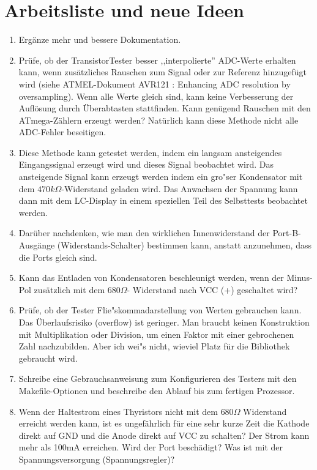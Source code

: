 
\chapter{Arbeitsliste und neue Ideen}
\label{sec:todo}

\begin{enumerate}
\item Erg\"anze mehr und bessere Dokumentation.
\item Pr\"ufe, ob der TransistorTester besser ,,interpolierte''  ADC-Werte erhalten kann, wenn zus\"atz\-liches Rauschen zum Signal
oder zur Referenz hinzugef\"ugt wird (siehe ATMEL-Dokument AVR121 \cite{AVR121}: Enhancing ADC resolution by oversampling).
Wenn alle Werte gleich sind, kann keine Verbesserung der Aufl\"osung durch \"Uberabtasten stattfinden.
Kann gen\"ugend Rauschen mit den ATmega-Z\"ahlern erzeugt werden?
Nat\"urlich kann diese Methode nicht alle ADC-Fehler beseitigen.
\item Diese Methode kann getestet werden, indem ein langsam ansteigendes Eingangssignal erzeugt wird und dieses
Signal beobachtet wird.
Das ansteigende Signal kann erzeugt werden indem ein gro"ser Kondensator mit dem \(470k\Omega\)-Widerstand geladen wird.
Das Anwachsen der Spannung kann dann mit dem LC-Display in einem speziellen Teil des Selbsttests beobachtet werden.
\item Dar\"uber nachdenken, wie man den wirklichen Innenwiderstand der Port-B-Aus\-g\"an\-ge (Wider\-stands-Schal\-ter) bestimmen kann,
anstatt anzunehmen, dass die Ports gleich sind.
\item Kann das Entladen von Kondensatoren beschleunigt werden, wenn der Minus-Pol zus\"atzlich mit dem \(680\Omega\)-
Widerstand nach VCC (+) geschaltet wird?
\item Pr\"ufe, ob der Tester Flie"skommadarstellung von Werten gebrauchen kann.
Das \"Uberlaufsrisiko (overflow) ist geringer.
Man braucht keinen Konstruktion mit Multiplikation oder Division, um einen Faktor mit einer gebrochenen Zahl nachzubilden.
Aber ich wei"s nicht, wieviel Platz f\"ur die Bibliothek gebraucht wird.
\item Schreibe eine Gebrauchsanweisung zum Konfigurieren des Testers mit den Makefile-Optionen und beschreibe
den Ablauf bis zum fertigen Prozessor.
\item Wenn der Haltestrom eines Thyristors nicht mit dem \(680\Omega\) Widerstand erreicht werden kann, 
ist es ungef\"ahrlich f\"ur eine sehr kurze Zeit die Kathode direkt auf GND und die Anode direkt auf VCC zu schalten?
Der Strom kann mehr als 100mA erreichen. Wird der Port besch\"adigt? Was ist mit der Spannungsversorgung (Spannungsregler)?

\end{enumerate}
